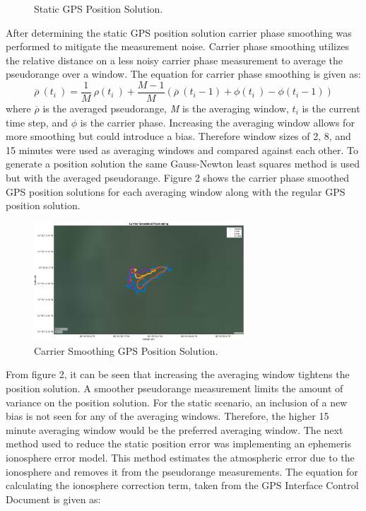 \documentclass[11pt]{article}
\begin{document}
\begin{enumerate}[label=\textbf{\arabic*.}]
\begin{figure}[H]
        \caption{Static GPS Position Solution.}
    \end{figure}
  After determining the static GPS position solution carrier phase smoothing was performed to mitigate the measurement noise. Carrier phase smoothing utilizes the relative distance on a less noisy carrier phase measurement to average the pseudorange over a window. The equation for carrier phase smoothing is given as:
    \begin{equation}
        \overline\rho\ (t_i\ )=\dfrac{1}{M}\ \rho(t_i\ )+\dfrac{M-1}{M}(\overline\rho\ (t_i-1)+\phi(t_i\ )-\phi(t_i-1))
    \end{equation}
  where \textit{$\overline\rho$} is the averaged pseudorange, \textit{M} is the averaging window, \textit{$t_i$} is the current time step, and \textit{$\phi$} is the carrier phase. Increasing the averaging window allows for more smoothing but could introduce a bias. Therefore window sizes of 2, 8, and 15 minutes were used as averaging windows and compared against each other. To generate a position solution the same Gauss-Newton least squares method is used but with the averaged pseudorange. Figure 2 shows the carrier phase smoothed GPS position solutions for each averaging window along with the regular GPS position solution. 
    \begin{figure}[H]
        \centering
        \includegraphics[width=0.7\textwidth]{p1_b.png}
        \caption{Carrier Smoothing GPS Position Solution.}
    \end{figure}
From figure 2, it can be seen that increasing the averaging window tightens the position solution. A smoother pseudorange measurement limits the amount of variance on the position solution. For the static scenario, an inclusion of a new bias is not seen for any of the averaging windows. Therefore, the higher 15 minute averaging window would be the preferred averaging window. The next method used to reduce the static position error was implementing an ephemeris ionosphere error model. This method estimates the atmospheric error due to the ionosphere and removes it from the pseudorange measurements. The equation for calculating the ionosphere correction term, taken from the GPS Interface Control Document is given as:

\end{enumerate}
\end{document}
